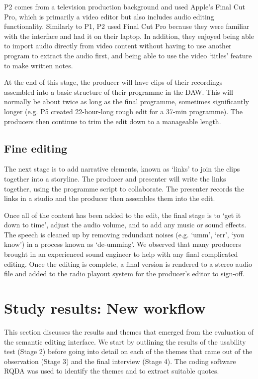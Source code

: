 P2 comes from a television production background and used Apple's Final Cut
Pro, which is primarily a video editor but also includes audio editing
functionality.  Similarly to P1, P2 used Final Cut Pro because they were
familiar with the interface and had it on their laptop. In addition, they
enjoyed being able to import audio directly from video content without having
to use another program to extract the audio first, and being able to use the
video `titles' feature to make written notes.

At the end of this stage, the producer will have clips of their recordings
assembled into a basic structure of their programme in the DAW. This will
normally be about twice as long as the final programme, sometimes significantly
longer (e.g. P5 created 22-hour-long rough edit for a 37-min programme). The
producers then continue to trim the edit down to a manageable length.

\subsection{Fine editing}
The next stage is to add narrative elements, known as `links' to join the clips
together into a storyline. The producer and presenter will write the links
together, using the programme script to collaborate. The presenter records
the links in a studio and the producer then assembles them into the edit.

Once all of the content has been added to the edit, the final stage is to `get
it down to time', adjust the audio volume, and to add any music or
sound effects. The speech is cleaned up by removing redundant noises (e.g.
`umm', `err', `you know') in a process known as `de-umming'. We observed that
many producers brought in an experienced sound engineer to help with any
final complicated editing.  Once the editing is complete, a final version is
rendered to a stereo audio file and added to the radio playout system for
the producer's editor to sign-off.

\section{Study results: New workflow}\label{sec:resultsnew}
This section discusses the results and themes that emerged from the evaluation
of the semantic editing interface. We start by outlining the results of the
usability test (Stage 2) before going into detail on each of the themes that
came out of the observation (Stage 3) and the final interview (Stage 4).
The coding software RQDA was used to identify the themes and to extract
suitable quotes.

